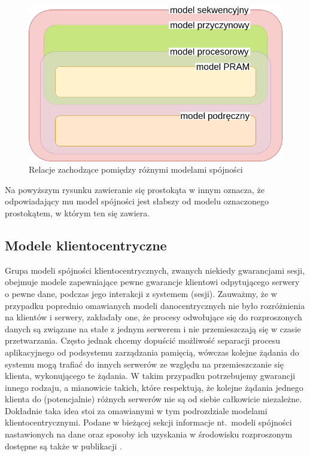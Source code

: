 \begin{figure}[H]
    \includegraphics[scale=0.45]{images/02-relations.png}
    \centering
    \caption{Relacje zachodzące pomiędzy różnymi modelami spójności}
    \label{figure:replication_relations}
\end{figure}

Na powyższym rysunku zawieranie się prostokąta w innym oznacza, że odpowiadający mu model spójności jest słabszy od modelu oznaczonego prostokątem, w którym ten się zawiera.

\subsection{Modele klientocentryczne} \label{subsection:clientcentric}

Grupa modeli spójności klientocentrycznych, zwanych niekiedy gwarancjami sesji, obejmuje modele zapewniające pewne gwarancje klientowi odpytującego serwery o pewne dane, podczas jego interakcji z systemem (sesji). Zauważmy, że w przypadku poprednio omawianych modeli danocentrycznych nie było rozróżnienia na klientów i serwery, zakładały one, że procesy odwołujące się do rozproszonych danych są związane na stałe z jednym serwerem i nie przemieszczają się w czasie przetwarzania. Często jednak chcemy dopuścić możliwość separacji procesu aplikacyjnego od podsystemu zarządzania pamięcią, wówczas kolejne żądania do systemu mogą trafiać do innych serwerów ze względu na przemieszczanie się klienta, wykonującego te żądania. W takim przypadku potrzebujemy gwarancji innego rodzaju, a mianowicie takich, które respektują, że kolejne żądania jednego klienta do (potencjalnie) różnych serwerów nie są od siebie całkowicie niezależne. Dokładnie taka idea stoi za omawianymi w tym podrozdziale modelami klientocentrycznymi. Podane w bieżącej sekcji informacje nt.\ modeli spójności nastawionych na dane oraz sposoby ich uzyskania w środowisku rozproszonym dostępne są także w publikacji \cite{TDP+94}.


